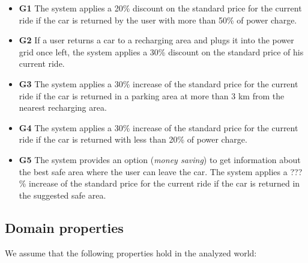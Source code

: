 \documentclass{article}
\begin{document}
\begin{itemize}
				\item \textbf{G1} The system applies a 20\% discount on the standard price for the current ride if the car is returned by the user with more than 50\% of power charge.
				\item \textbf{G2} If a user returns a car to a recharging area and plugs it into the power grid once left, the system applies a 30\% discount on the standard price of his current ride.
				\item \textbf{G3} The system applies a 30\% increase of the standard price for the current ride if the car is returned in a parking area at more than 3 km from the nearest recharging area. %
				\item \textbf{G4} The system applies a 30\% increase of the standard price for the current ride if the car is returned with less than 20\% of power charge. %
				\item \textbf{G5} The system provides an option (\textit{money saving}) to get information about the best safe area where the user can leave the car. The system applies a ???\% increase of the standard price for the current ride if the car is returned in the suggested safe area. %
			\end{itemize}

		\subsection{Domain properties}
			
			We assume that the following properties hold in the analyzed world:			
			
\end{document}
